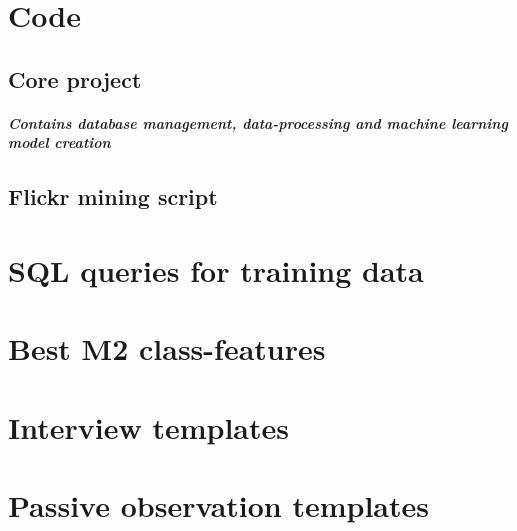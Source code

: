 \appendix

\chapter{Code} \label{python_code}

\section{Core project}
\paragraph*{Contains database management, data-processing and machine learning model creation}
\clearpage

\section{Flickr mining script}
\clearpage


\chapter{SQL queries for training data} \label{sql_queries_for_trainingdata}



\chapter{Best M2 class-features} \label{M2_top_features}

\chapter{Interview templates} \label{interview_templates}

\chapter{Passive observation templates} \label{passive_obs_templates}

